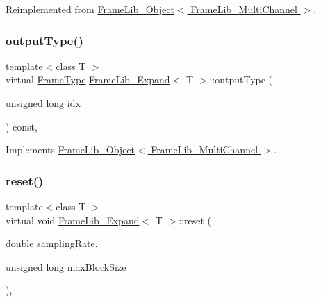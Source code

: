 Reimplemented from \hyperlink{class_frame_lib___object_a6e6d79e8d620eedbaa50abf324cdedf5}{Frame\+Lib\+\_\+\+Object$<$ Frame\+Lib\+\_\+\+Multi\+Channel $>$}.

\mbox{\label{class_frame_lib___expand_a5ab23cdee5ca51ed5098b8a99164aa6a}} 
\subsubsection{\texorpdfstring{output\+Type()}{outputType()}}
{\footnotesize\ttfamily template$<$class T $>$ \\
virtual \hyperlink{_frame_lib___types_8h_ad495a9f61af7fff07d7e97979d1ab854}{Frame\+Type} \hyperlink{class_frame_lib___expand}{Frame\+Lib\+\_\+\+Expand}$<$ T $>$\+::output\+Type (\begin{DoxyParamCaption}\item[{unsigned long}]{idx }\end{DoxyParamCaption}) const\hspace{0.3cm}{\ttfamily [inline]}, {\ttfamily [virtual]}}



Implements \hyperlink{class_frame_lib___object_a03eb408844f15d8f73cee67f43149b9d}{Frame\+Lib\+\_\+\+Object$<$ Frame\+Lib\+\_\+\+Multi\+Channel $>$}.

\mbox{\label{class_frame_lib___expand_a579f16ec32e05ff84ee766038012fc3f}} 
\subsubsection{\texorpdfstring{reset()}{reset()}}
{\footnotesize\ttfamily template$<$class T $>$ \\
virtual void \hyperlink{class_frame_lib___expand}{Frame\+Lib\+\_\+\+Expand}$<$ T $>$\+::reset (\begin{DoxyParamCaption}\item[{double}]{sampling\+Rate,  }\item[{unsigned long}]{max\+Block\+Size }\end{DoxyParamCaption})\hspace{0.3cm}{\ttfamily [inline]}, {\ttfamily [virtual]}}



